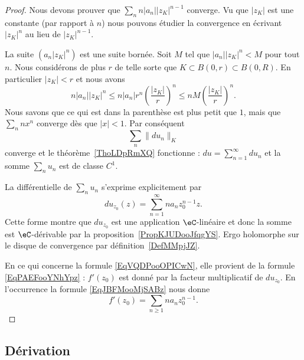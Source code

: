 \begin{proof}
    Nous devons prouver que \( \sum_nn| a_n | |z_K |^{n-1}\) converge. Vu que \( | z_K |\) est une constante (par rapport à \( n\)) nous pouvons étudier la convergence en écrivant \( | z_K |^n\) au lieu de \( | z_K |^{n-1}\).

    La suite \( (a_n| z_K |^n)\) est une suite bornée. Soit \( M\) tel que \( | a_n | |z_K |^n<M\) pour tout \( n\). Nous considérons de plus \( r\) de telle sorte que \( K\subset B(0,r)\subset B(0,R)\). En particulier \( | z_K |<r\) et nous avons
    \begin{equation}
        n| a_n | |z_K |^n\leq n| a_n |r^n\left( \frac{ | z_K | }{ r } \right)^n\leq nM\left( \frac{ | z_K | }{ r } \right)^n.
    \end{equation}
    Nous savons que ce qui est dans la parenthèse est plus petit que \( 1\), mais que \( \sum_nnx^n\) converge dès que \( | x |<1\). Par conséquent
    \begin{equation}
        \sum_n\| du_n \|_K
    \end{equation}
    converge et le théorème~\ref{ThoLDpRmXQ} fonctionne : \( du=\sum_{n=1}^{\infty}du_n\) et la somme \( \sum_nu_n\) est de classe \( C^1\).

    La différentielle de \( \sum_nu_n\) s'exprime explicitement par
    \begin{equation}        \label{EqJBFMooMjSABz}
        du_{z_0}(z)=\sum_{n=1}^{\infty}na_nz_0^{n-1}z.
    \end{equation}
    Cette forme montre que \( du_{z_0}\) est une application \( \eC\)-linéaire et donc la somme est \( \eC\)-dérivable par la proposition~\ref{PropKJUDooJfqgYS}. Ergo holomorphe sur le disque de convergence par définition~\ref{DefMMpjJZ}.

    En ce qui concerne la formule \eqref{EqVQDPooOPICwN}, elle provient de la formule \eqref{EqPAEFooYNhYpz} : \( f'(z_0)\) est donné par la facteur multiplicatif de \( du_{z_0}\). En l'occurrence la formule \eqref{EqJBFMooMjSABz} nous donne
    \begin{equation}
        f'(z_0)=\sum_{n\geq 1}na_nz_0^{n-1}.
    \end{equation}
\end{proof}

\subsection{Dérivation}

